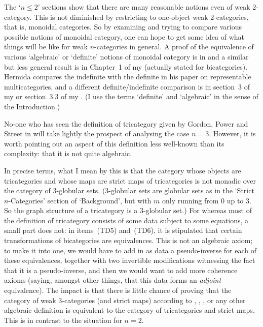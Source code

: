 The `$n\leq 2$' sections show that there are many reasonable notions even of
weak $2$-category.  This is not diminished by restricting to one-object weak
$2$-categories, that is, monoidal categories.  So by examining and trying to
compare various possible notions of monoidal category, one can hope to get
some idea of what things will be like for weak $n$-categories in general.  A
proof of the equivalence of various `algebraic' or `definite' notions of
monoidal category is in
% 
%
% 
and a similar but less general result is in Chapter~1 of my 
(actually stated for bicategories).  Hermida compares the indefinite with the
definite in his paper  on representable multicategories, and a
different definite/indefinite comparison is in section~3 of my  or
section~3.3 of my .  (I use the terms `definite' and `algebraic' in
the sense of the Introduction.)

No-one who has seen the definition of tricategory given by Gordon, Power and
Street in  will take lightly the prospect of analysing the case
$n=3$.  However, it is worth pointing out an aspect of this definition less
well-known than its complexity: that it is not quite algebraic.  

In precise terms, what I mean by this is that the category whose objects are
tricategories and whose maps are strict maps of tricategories is not monadic
over the category of $3$-globular sets.  ($3$-globular sets are globular sets
as in the `Strict $n$-Categories' section of `Background', but with $m$ only
running from $0$ up to $3$.  So the graph structure of a tricategory is a
$3$-globular set.)  For whereas most of the definition of tricategory
consists of some data subject to some equations, a small part does not: in
items~(TD5) and~(TD6), it is stipulated that certain transformations of
bicategories are equivalences.  This is not an algebraic axiom; to make it
into one, we would have to add in as data a pseudo-inverse for each of these
equivalences, together with two invertible modifications witnessing the fact
that it is a pseudo-inverse, and then we would want to add more coherence
axioms (saying, amongst other things, that this data forms an \emph{adjoint}
equivalence).  The impact is that there is little chance of proving that the
category of weak $3$-categories (and strict maps) according to ,
, , or any other algebraic definition is equivalent to the
category of tricategories and strict maps.  This is in contrast to the
situation for $n=2$.



